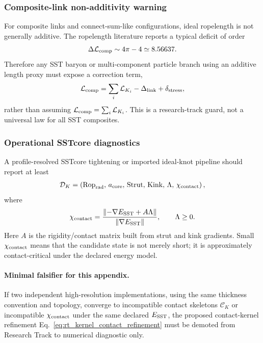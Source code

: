 \subsubsection{Composite-link non-additivity warning}
For composite links and connect-sum-like configurations, ideal ropelength is
not generally additive.  The ropelength literature reports a typical deficit
of order
\begin{align}
    \Delta\mathcal L_{\rm comp}
    \sim
    4\pi-4
    \simeq 8.56637 .
    \label{eq:rt_composite_link_deficit}
\end{align}
Therefore any SST baryon or multi-component particle branch using an additive
length proxy must expose a correction term,
\begin{align}
    \mathcal L_{\rm comp}
    =
    \sum_i\mathcal L_{K_i}
    -\Delta_{\rm link}
    +\delta_{\rm stress},
    \label{eq:rt_composite_nonadditive_length}
\end{align}
rather than assuming $\mathcal L_{\rm comp}=\sum_i\mathcal L_{K_i}$.  This is a
research-track guard, not a universal law for all SST composites.

\subsubsection{Operational SSTcore diagnostics}
A profile-resolved SSTcore tightening or imported ideal-knot pipeline should
report at least
\begin{align}
    \mathcal D_K
    =
    \left(
        \operatorname{Rop}_{\rm rad},\,
        a_{\rm core},\,
        \operatorname{Strut},\,
        \operatorname{Kink},\,
        \Lambda,\,
        \chi_{\rm contact}
    \right),
    \label{eq:rt_sstcore_contact_diagnostics}
\end{align}
where
\begin{align}
    \chi_{\rm contact}
    =
    \frac{\left\|-
        \nabla E_{\rm SST}+A\Lambda\right\|}
         {\left\|\nabla E_{\rm SST}\right\|},
    \qquad
    \Lambda\ge0 .
    \label{eq:rt_contact_residual}
\end{align}
Here $A$ is the rigidity/contact matrix built from strut and kink gradients.
Small $\chi_{\rm contact}$ means that the candidate state is not merely short;
it is approximately contact-critical under the declared energy model.

\paragraph{Minimal falsifier for this appendix.}
If two independent high-resolution implementations, using the same thickness
convention and topology, converge to incompatible contact skeletons
$\mathcal C_K$ or incompatible $\chi_{\rm contact}$ under the same declared
$E_{\rm SST}$, the proposed contact-kernel refinement
Eq.~\eqref{eq:rt_kernel_contact_refinement} must be demoted from
Research Track to numerical diagnostic only.


